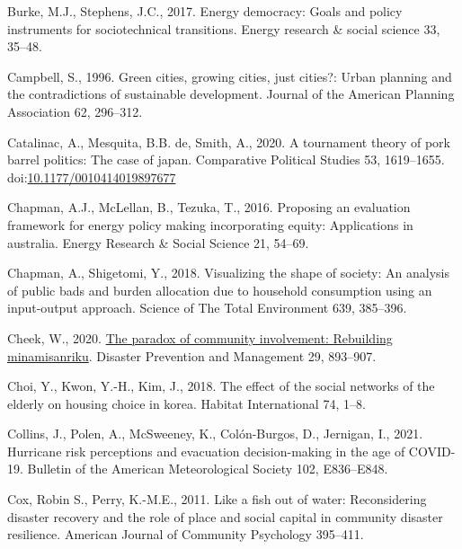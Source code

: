 \documentclass[]{elsarticle} %
\newlength{\cslhangindent}
\newlength{\cslentryspacingunit} %
\newenvironment{CSLReferences}[2] %
 {%
  \setlength{\parindent}{0pt}
  \ifodd #1
  \let\oldpar\par
  \def\par{\hangindent=\cslhangindent\oldpar}
  \fi
  \setlength{\parskip}{#2\cslentryspacingunit}
 }%
 {}
\begin{document}
\begin{CSLReferences}{1}{0}
\leavevmode{}%
Burke, M.J., Stephens, J.C., 2017. Energy democracy: Goals and policy
instruments for sociotechnical transitions. Energy research \& social
science 33, 35--48.

\leavevmode{}%
Campbell, S., 1996. Green cities, growing cities, just cities?: Urban
planning and the contradictions of sustainable development. Journal of
the American Planning Association 62, 296--312.

\leavevmode{}%
Catalinac, A., Mesquita, B.B. de, Smith, A., 2020. A tournament theory
of pork barrel politics: The case of japan. Comparative Political
Studies 53, 1619--1655.
doi:\href{https://doi.org/10.1177/0010414019897677}{10.1177/0010414019897677}

\leavevmode{}%
Chapman, A.J., McLellan, B., Tezuka, T., 2016. Proposing an evaluation
framework for energy policy making incorporating equity: Applications in
australia. Energy Research \& Social Science 21, 54--69.

\leavevmode{}%
Chapman, A., Shigetomi, Y., 2018. Visualizing the shape of society: An
analysis of public bads and burden allocation due to household
consumption using an input-output approach. Science of The Total
Environment 639, 385--396.

\leavevmode{}%
Cheek, W., 2020. \href{https://doi.org/10.1108/DPM-12-2019-0374}{The
paradox of community involvement: Rebuilding minamisanriku}. Disaster
Prevention and Management 29, 893--907.

\leavevmode{}%
Choi, Y., Kwon, Y.-H., Kim, J., 2018. The effect of the social networks
of the elderly on housing choice in korea. Habitat International 74,
1--8.

\leavevmode{}%
Collins, J., Polen, A., McSweeney, K., Colón-Burgos, D., Jernigan, I.,
2021. Hurricane risk perceptions and evacuation decision-making in the
age of COVID-19. Bulletin of the American Meteorological Society 102,
E836--E848.

\leavevmode{}%
Cox, Robin S., Perry, K.-M.E., 2011. Like a fish out of water:
Reconsidering disaster recovery and the role of place and social capital
in community disaster resilience. American Journal of Community
Psychology 395--411.


\end{CSLReferences}
\end{document}

